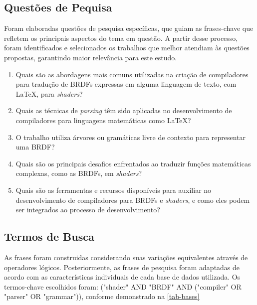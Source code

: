 \documentclass[english, 
               brazil, 
               bsc] %
               {dcomp-abntex2}
\begin{document}
% 
%

%




\subsection{Questões de Pequisa}  \label{questoes-pesquisa}

Foram elaboradas questões de pesquisa específicas, que guiam as frases-chave que refletem os principais aspectos do tema em questão. A partir desse processo, foram identificados e selecionados os trabalhos que melhor atendiam às questões propostas, garantindo maior relevância para este estudo.

\begin{enumerate}
  \item Quais são as abordagens mais comuns utilizadas na criação de compiladores para tradução de BRDFs expressas em alguma linguagem de texto, com \LaTeX , para \textit{shaders}?

  \item Quais as técnicas de \textit{parsing} têm sido aplicadas no desenvolvimento de compiladores para linguagens matemáticas como \LaTeX ?

  \item O trabalho utiliza árvores ou gramáticas livre de contexto para representar uma BRDF?

 \item Quais são os principais desafios enfrentados ao traduzir funções matemáticas complexas, como as BRDFs, em \textit{shaders}?

 \item Quais são as ferramentas e recursos disponíveis para auxiliar no desenvolvimento de compiladores para BRDFs e \textit{shaders}, e como eles podem ser integrados ao processo de desenvolvimento?

\end{enumerate}



\subsection{Termos de Busca}
 As frases foram construidas considerando suas variações equivalentes através de operadores lógicos. Posteriormente, as frases de pesquisa foram adaptadas de acordo com as características individuais de cada base de dados utilizada. Os termos-chave escolhidos foram: ("shader" AND "BRDF" AND ("compiler" OR "parser" OR "grammar")), conforme demonstrado na \autoref{tab-bases}
\end{document}
